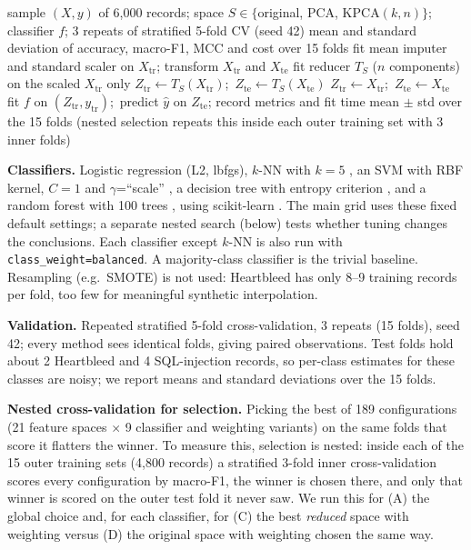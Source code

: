 \documentclass[runningheads]{llncs}
\begin{document}
\begin{algorithm}[t]
\caption{Fold-wise evaluation of one feature space $S$ and classifier $f$}\label{alg:cv}
\begin{algorithmic}[1]
\Require sample $(X,y)$ of 6,000 records; space $S\in\{$original, PCA, KPCA$(k,n)\}$; classifier $f$; 3 repeats of stratified 5-fold CV (seed 42)
\Ensure mean and standard deviation of accuracy, macro-F1, MCC and cost over 15 folds
  \State fit mean imputer and standard scaler on $X_{\mathrm{tr}}$; transform $X_{\mathrm{tr}}$ and $X_{\mathrm{te}}$
    \State fit reducer $T_S$ ($n$ components) on the scaled $X_{\mathrm{tr}}$ only
    \State $Z_{\mathrm{tr}}\gets T_S(X_{\mathrm{tr}})$;\ $Z_{\mathrm{te}}\gets T_S(X_{\mathrm{te}})$
  \Else
    \State $Z_{\mathrm{tr}}\gets X_{\mathrm{tr}}$;\ $Z_{\mathrm{te}}\gets X_{\mathrm{te}}$
  \EndIf
  \State fit $f$ on $(Z_{\mathrm{tr}},y_{\mathrm{tr}})$;\ predict $\hat{y}$ on $Z_{\mathrm{te}}$; record metrics and fit time
\EndFor
\State \Return mean $\pm$ std over the 15 folds (nested selection repeats this inside each outer training set with 3 inner folds)
\end{algorithmic}
\end{algorithm}

\textbf{Classifiers.} Logistic regression (L2, lbfgs), $k$-NN with $k=5$ \cite{cover1967}, an SVM with RBF kernel, $C=1$ and $\gamma$=``scale'' \cite{cortes1995}, a decision tree with entropy criterion \cite{quinlan1986}, and a random forest with 100 trees \cite{breiman2001}, using scikit-learn \cite{pedregosa2011}. The main grid uses these fixed default settings; a separate nested search (below) tests whether tuning changes the conclusions. Each classifier except $k$-NN is also run with \texttt{class\_weight=balanced}. A majority-class classifier is the trivial baseline. Resampling (e.g.\ SMOTE) is not used: Heartbleed has only 8--9 training records per fold, too few for meaningful synthetic interpolation.

\textbf{Validation.} Repeated stratified 5-fold cross-validation, 3 repeats (15 folds), seed 42; every method sees identical folds, giving paired observations. Test folds hold about 2 Heartbleed and 4 SQL-injection records, so per-class estimates for these classes are noisy; we report means and standard deviations over the 15 folds.

\textbf{Nested cross-validation for selection.} Picking the best of 189 configurations (21 feature spaces $\times$ 9 classifier and weighting variants) on the same folds that score it flatters the winner. To measure this, selection is nested: inside each of the 15 outer training sets (4{,}800 records) a stratified 3-fold inner cross-validation scores every configuration by macro-F1, the winner is chosen there, and only that winner is scored on the outer test fold it never saw. We run this for (A) the global choice and, for each classifier, for (C) the best \emph{reduced} space with weighting versus (D) the original space with weighting chosen the same way.
\end{document}
